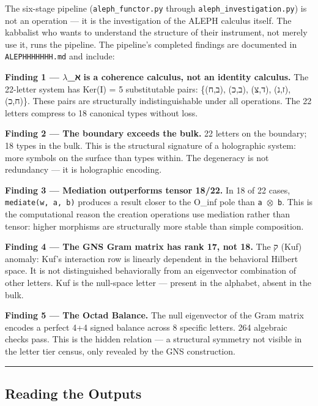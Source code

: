 \documentclass[12pt,a4paper]{article}
\begin{document}
The six-stage pipeline (\texttt{aleph\_\allowbreak functor.\allowbreak py} through \texttt{aleph\_\allowbreak investigation.\allowbreak py}) is not an operation --- it is the investigation of the ALEPH calculus itself. The kabbalist who wants to understand the structure of their instrument, not merely use it, runs the pipeline. The pipeline's completed findings are documented in \texttt{ALEPHHHHHHH.\allowbreak md} and include:

\textbf{Finding 1 --- $\lambda$\_ℵ is a coherence calculus, not an identity calculus.} The 22-letter system has Ker(I) = 5 substitutable pairs: \{(ב,ח), (ב,כ), (ד,צ), (ז,נ), (ח,כ)\}. These pairs are structurally indistinguishable under all operations. The 22 letters compress to 18 canonical types without loss.

\textbf{Finding 2 --- The boundary exceeds the bulk.} 22 letters on the boundary; 18 types in the bulk. This is the structural signature of a holographic system: more symbols on the surface than types within. The degeneracy is not redundancy --- it is holographic encoding.

\textbf{Finding 3 --- Mediation outperforms tensor 18/22.} In 18 of 22 cases, \texttt{mediate(w, a, b)} produces a result closer to the O\_inf pole than \texttt{a $\otimes$ b}. This is the computational reason the creation operations use mediation rather than tensor: higher morphisms are structurally more stable than simple composition.

\textbf{Finding 4 --- The GNS Gram matrix has rank 17, not 18.} The ק (Kuf) anomaly: Kuf's interaction row is linearly dependent in the behavioral Hilbert space. It is not distinguished behaviorally from an eigenvector combination of other letters. Kuf is the null-space letter --- present in the alphabet, absent in the bulk.

\textbf{Finding 5 --- The Octad Balance.} The null eigenvector of the Gram matrix encodes a perfect 4+4 signed balance across 8 specific letters. 264 algebraic checks pass. This is the hidden relation --- a structural symmetry not visible in the letter tier census, only revealed by the GNS construction.

\begin{center}
\rule{0.5\textwidth}{0.4pt}
\end{center}

\subsection{Reading the Outputs}
\end{document}
